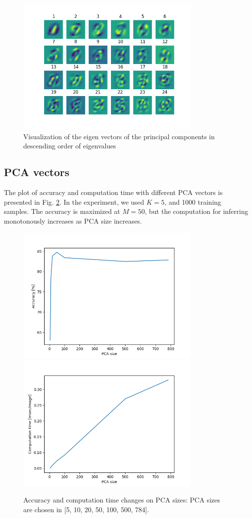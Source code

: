 \documentclass[conference]{IEEEtran}
\begin{document}
\begin{figure}[!t]
	\centering
	\includegraphics[width=3.6in]{eigen_vectors.png}
	
	\caption{Visualization of the eigen vectors of the principal components in descending order of eigenvalues}
	\label{fig:eig_vecs}
\end{figure}


\subsection{PCA vectors}

The plot of accuracy and computation time with different PCA vectors is presented in Fig. \ref{fig:pca_test}.
In the experiment, we used $K=5$, and 1000 training samples.
The accuracy is maximized at $M=50$, but the computation for inferring monotonously increases as PCA size increases.

\begin{figure}[!t]
	\centering
	\includegraphics[width=3.6in]{pca_test.png}	
	\includegraphics[width=3.6in]{pca_time.png}	
	\caption{Accuracy and computation time changes on PCA sizes: PCA sizes are chosen in [5, 10, 20, 50, 100, 500, 784].}
	\label{fig:pca_test}
\end{figure}
\end{document}
